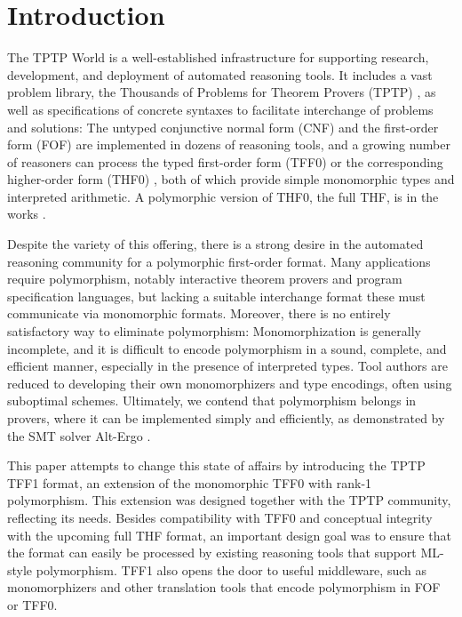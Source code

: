\section{Introduction}
\label{sec_intro}

The TPTP World \cite{sutcliffe-2010-world} is a well-established infrastructure
for supporting research, development, and deployment of automated reasoning
tools. It includes a vast problem library, the Thousands of Problems for Theorem
Provers (TPTP) \cite{sutcliffe-2009-lib}, as well as specifications of concrete
syntaxes to facilitate interchange of problems and solutions: The untyped
conjunctive normal form (CNF) and the first-order form (FOF) are implemented in
dozens of reasoning tools, and a growing number of reasoners can process the
typed first-order form (TFF0) \cite{sutcliffe-et-al-2011-tff0} or the
corresponding higher-order form (THF0) \cite{benzmueller-et-al-2008-thf0}, both
of which provide simple monomorphic types and interpreted arithmetic. A
polymorphic version of THF0, the full THF, is in the works
\cite{sutcliffe-benzmueller-2010}.

Despite the variety of this offering, there is a strong desire in the automated
reasoning community for a polymorphic first-order format. Many applications
require polymorphism, notably interactive theorem provers and program
specification languages, but lacking a suitable interchange format these
must communicate via monomorphic formats. Moreover, there is no entirely
satisfactory way to eliminate polymorphism: Monomorphization is generally
incomplete, and it is difficult to encode polymorphism in a sound, complete, and
efficient manner, especially in the presence of interpreted types. Tool authors
are reduced to developing their own monomorphizers and type encodings, often
using suboptimal schemes. Ultimately, we contend that polymorphism belongs in
provers, where it can be implemented simply and efficiently, as demonstrated by
the SMT solver Alt-Ergo \cite{bobot-et-al-2008}.

This paper attempts to change this state of affairs by introducing the TPTP TFF1
format, an extension of the monomorphic TFF0 with rank-1 polymorphism. This
extension was designed together with the TPTP community, reflecting its needs.
Besides compatibility with TFF0 and conceptual integrity with the upcoming full
THF format, an important design goal was to ensure that the format can easily be
processed by existing reasoning tools that support ML-style polymorphism. TFF1
also opens the door to useful middleware, such as monomorphizers and other
translation tools that encode polymorphism in FOF or TFF0.

